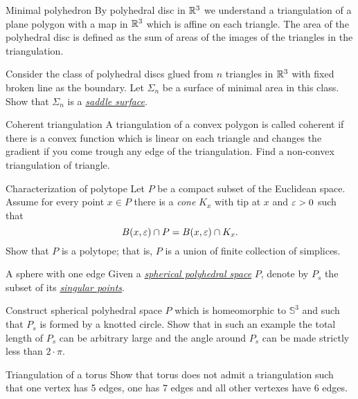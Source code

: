 \documentclass[twoside]{book}
\begin{document}
{\begin{pr}{}{Minimal polyhedron}\label{Minimal polyhedron}
By polyhedral disc in $\mathbb{R}^3$
we understand a triangulation of a plane polygon with a map in $\mathbb{R}^3$ which is affine on each triangle.
The area of the polyhedral disc is defined as the sum of areas of the images of the triangles in the triangulation.

Consider the  class of polyhedral discs glued from $n$ triangles in $\mathbb{R}^3$ 
with fixed broken line as the boundary.
Let $\Sigma_n$ be a surface of minimal area in this class.
Show that $\Sigma_n$ is a \hyperref[Saddle surface]{\emph{saddle surface}}.
\end{pr}


\begin{pr}{}{Coherent triangulation}\label{Coherent triangulation} 
A triangulation of a convex polygon is called coherent if there is a convex function which is linear on each triangle and changes the gradient if you come trough any edge of the triangulation.
Find a non-convex triangulation of triangle.
\end{pr}

\begin{pr}{\thm}{Characterization of polytope}
\label{conic neighborhoods}
Let $P$ be a compact subset of the Euclidean space.
Assume for every point $x\in P$
there is a \emph{cone} $K_x$ with tip at $x$ and $\varepsilon>0$
such that 
$$B(x,\varepsilon)\cap P
=
B(x,\varepsilon)\cap K_x.$$
Show that $P$ is a polytope; 
that is, $P$ is a union of finite collection of simplices.
\end{pr}

\begin{pr}{\hard}{A sphere with one edge}\label{panov-S^3} 
Given  a \hyperref[Polyhedral space]{\emph{spherical polyhedral space}} $P$,
denote by $P_s$ the subset of its 
\hyperref[Polyhedral space]{\emph{singular points}}.

Construct spherical polyhedral space $P$ which is homeomorphic to $\mathbb{S}^3$ and such that $P_s$ is formed by a knotted circle.
Show that in such an example the total length of $P_s$ can be arbitrary large and the angle around $P_s$ can be made strictly less than $2\cdot\pi$.
\end{pr}

\begin{pr}{}{Triangulation of a torus}\label{Triangulation of a torus}
Show that torus does not admit a triangulation 
such that one vertex has 5 edges,
one has 7 edges and 
all other vertexes have 
6 edges. 
\end{pr}

}
\end{document}
